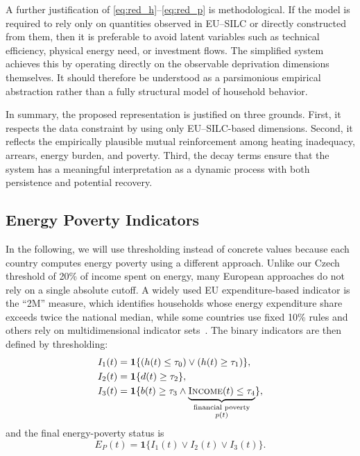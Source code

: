 \documentclass[11pt,a4paper]{article}
\begin{document}
A further justification of \eqref{eq:red_h}--\eqref{eq:red_p} is methodological. If the model is required to rely only on quantities observed in EU--SILC or directly constructed from them, then it is preferable to avoid latent variables such as technical efficiency, physical energy need, or investment flows. The simplified system achieves this by operating directly on the observable deprivation dimensions themselves. It should therefore be understood as a parsimonious empirical abstraction rather than a fully structural model of household behavior.

In summary, the proposed representation is justified on three grounds. First, it respects the data constraint by using only EU--SILC-based dimensions. Second, it reflects the empirically plausible mutual reinforcement among heating inadequacy, arrears, energy burden, and poverty. Third, the decay terms ensure that the system has a meaningful interpretation as a dynamic process with both persistence and potential recovery.

\subsection{Energy Poverty Indicators}
In the following, we will use thresholding instead of concrete values because each country computes energy poverty using a different approach. Unlike our Czech threshold of 20\% of income spent on energy, many European approaches do not rely on a single absolute cutoff. A widely used EU expenditure-based indicator is the “2M” measure, which identifies households whose energy expenditure share exceeds twice the national median, while some countries use fixed 10\% rules and others rely on multidimensional indicator sets~\cite{EPAH_indicators_dashboard}. The binary indicators are then defined by thresholding:
\begin{align} \label{binary indicators new}
I_1(t) &= \mathbf{1}\{(h(t)\leq \tau_0)\vee(h(t)\geq\tau_1)\},\\
I_2(t) &= \mathbf{1}\{d(t)\ge \tau_2\},\\
I_3(t) &= \mathbf{1}\{b(t)\ge \tau_3 \land \underbrace{\textsc{Income}(t)\leq \tau_4}_{
  \substack{\text{financial poverty}\\{p(t)}}
}\},
\end{align}
and the final energy-poverty status is
\[
E_P(t)=\mathbf{1}\{I_1(t)\lor I_2(t)\lor I_3(t)\}.
\]
\end{document}
